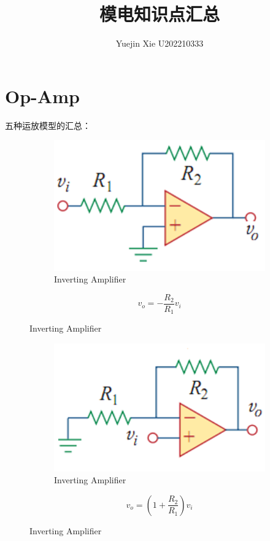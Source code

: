 \documentclass[a4paper,11pt,UTF8]{article}
\title{模电知识点汇总}
\author{Yuejin Xie \quad U202210333}
\date{}
\begin{document}
\maketitle
\section{Op-Amp}
五种运放模型的汇总：

\begin{figure}[H]
	\begin{minipage}{.69\textwidth}
		\begin{figure}[H] 
			\centering 
			\includegraphics[scale=0.5]{./img/9.1.png}
			\caption{Inverting Amplifier}
		\end{figure}
	\end{minipage}
	\begin{minipage}{.29\textwidth}
		\LARGE{$$
			v_o=-\frac{R_2}{R_1}v_i
			$$}
	\end{minipage}
\end{figure}

\begin{figure}[H]
	\begin{minipage}{.69\textwidth}
		\begin{figure}[H] 
			\centering 
			\includegraphics[scale=0.5]{./img/9.2.png}
			\caption{Inverting Amplifier}
		\end{figure}
	\end{minipage}
	\begin{minipage}{.29\textwidth}
		\LARGE{$$
			v_o=(1+\frac{R_2}{R_1})v_i
			$$}
	\end{minipage}
\end{figure}
\end{document}
